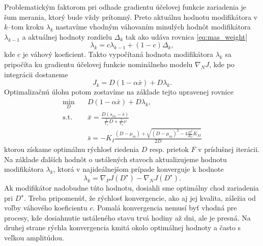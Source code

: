 Problematickým faktorom pri odhade gradientu účelovej funkcie zariadenia je šum merania, ktorý bude vždy prítomný. Preto aktuálnu hodnotu modifikátora v $ k $--tom kroku $ \lambda_k $ nastavíme vhodným váhovaním minulých hodnôt modifikátora $ \lambda_{k-1} $ a aktuálnej hodnoty rozdielu $ \Delta_{k} $ tak ako udáva rovnica \eqref{eq:mas_weight}
\begin{equation*}
	\lambda_k = c\lambda_{k-1} + \left(1 - c\right)\Delta_{k},
\end{equation*}
kde $ c $ je váhový koeficient. Takto vypočítaná hodnota modifikátora $ \lambda_k $ sa pripočíta ku gradientu účelovej funkcie nominálneho modelu $ \nabla_{N}J $, kde po integrácii dostaneme
\begin{equation}
	J_{k} = D\left(1-\alpha\bar{x}\right) + D\lambda_k.
\end{equation}
Optimalizačnú úlohu potom zostavíme na základe tejto upravenej rovnice
\begin{equation}
	\begin{split}
		\min_{D} &\quad D\left(1-\alpha\bar{x}\right) + D\lambda_k, \\
		\text{s.t.} &\quad \bar{x} = \frac{D\left(s_{in}-\bar{s}\right)}{\frac{1}{Y_{x}}D + \frac{1}{Y_{x}}\nu} \\
		&\quad \bar{s} = -K_{I}\frac{\left(D-\mu_{m}\right) + \sqrt{\left(D-\mu_{m}\right)^2 - 4\frac{D^2}{K_{I}}K_{M}}}{2D}
	\end{split}
\end{equation}
ktorou získame optimálnu rýchlosť riedenia $ D $ resp. prietok $ F $ v príslušnej iterácii. Na základe ďalších hodnôt o ustálených stavoch aktualizujeme hodnotu modifikátora $ \lambda_k $, ktorá v 
najideálnejšom prípade konverguje k hodnote
\begin{equation}
	\label{eq:mas_opt_lambda}
	\lambda_k = \nabla_{P}J\left(D^{\star}\right) - \nabla_{N}J\left(D^{\star}\right).
\end{equation} 
Ak modifikátor nadobudne túto hodnotu, dosiahli sme optimálny chod zariadenia pri $ D^{\star} $. Treba pripomenúť, že rýchlosť konvergencie, ako aj jej kvalita, záležia od voľby váhového koeficientu $ c $. Pomalá konvergencia nemusí byť vhodná pre procesy, kde dosiahnutie ustáleného stavu trvá hodiny až dni, ale je presná. Na druhej strane rýchla konvergencia kmitá okolo optimálnej hodnoty a často s veľkou amplitúdou.
